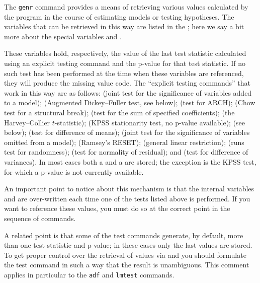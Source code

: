 The \verb+genr+ command provides a means of retrieving various values
calculated by the program in the course of estimating models or
testing hypotheses.  The variables that can be retrieved in this way
are listed in the \GCR; here we say a bit more about the special
variables  and .

These variables hold, respectively, the value of the last test
statistic calculated using an explicit testing command and the p-value
for that test statistic.  If no such test has been performed at the
time when these variables are referenced, they will produce the
missing value code.  The ``explicit testing commands'' that work in
this way are as follows:  (joint test for the significance of
variables added to a model);  (Augmented Dickey--Fuller test,
see below);  (test for ARCH);  (Chow test for a
structural break);  (test for the sum of specified
coefficients);  (the Harvey--Collier $t$-statistic);
 (KPSS stationarity test, no p-value available);
 (see below);  (test for difference of
means);  (joint test for the significance of variables
omitted from a model);  (Ramsey's RESET); 
(general linear restriction);  (runs test for randomness);
 (test for normality of residual); and 
(test for difference of variances). In most cases both a 
and a  are stored; the exception is the KPSS test, for
which a p-value is not currently available.
    
An important point to notice about this mechanism is that the internal
variables  and  are over-written each time
one of the tests listed above is performed.  If you want to reference
these values, you must do so at the correct point in the sequence of
 commands.  

A related point is that some of the test commands generate, by
default, more than one test statistic and p-value; in these cases only
the last values are stored. To get proper control over the retrieval
of values via  and  you should formulate the
test command in such a way that the result is unambiguous.  This
comment applies in particular to the \verb+adf+ and \verb+lmtest+
commands.

